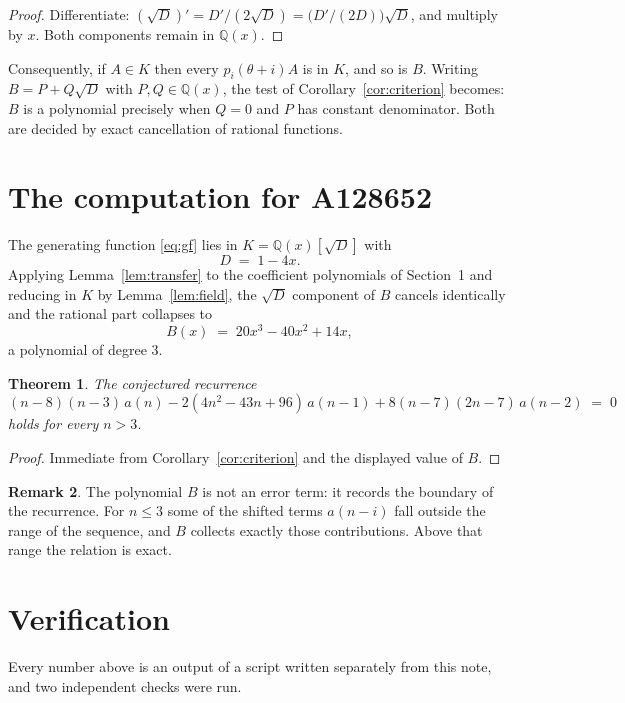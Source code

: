 \documentclass[11pt,a4paper]{article}
\theoremstyle{plain}
\newtheorem{theorem}{Theorem}
\theoremstyle{definition}
\newtheorem{remark}[theorem]{Remark}
\begin{document}
\begin{proof}
Differentiate: $(\sqrt{D})'=D'/(2\sqrt{D})=\bigl(D'/(2D)\bigr)\sqrt{D}$, and multiply by
$x$. Both components remain in $\mathbb{Q}(x)$.
\end{proof}

Consequently, if $A\in K$ then every $p_{i}(\theta+i)A$ is in $K$, and so is $B$. Writing
$B=P+Q\sqrt{D}$ with $P,Q\in\mathbb{Q}(x)$, the test of Corollary~\ref{cor:criterion}
becomes: $B$ is a polynomial precisely when $Q=0$ and $P$ has constant denominator. Both
are decided by exact cancellation of rational functions.

\section{The computation for A128652}

The generating function \eqref{eq:gf} lies in $K=\mathbb{Q}(x)[\sqrt{D}]$ with
\[
D \;=\; 1 - 4 x .
\]
Applying Lemma~\ref{lem:transfer} to the coefficient polynomials of Section~1 and reducing
in $K$ by Lemma~\ref{lem:field}, the $\sqrt{D}$ component of $B$ cancels identically and
the rational part collapses to
\[
B(x)\;=\;20 x^{3} - 40 x^{2} + 14 x ,
\]
a polynomial of degree $3$.

\begin{theorem}
The conjectured recurrence
\[
\left(n - 8\right) \left(n - 3\right)\,a(n) -  2 \left(4 n^{2} - 43 n + 96\right)\,a(n-1) + 8 \left(n - 7\right) \left(2 n - 7\right)\,a(n-2) \;=\;0
\]
holds for every $n>3$.
\end{theorem}

\begin{proof}
Immediate from Corollary~\ref{cor:criterion} and the displayed value of $B$.
\end{proof}

\begin{remark}
The polynomial $B$ is not an error term: it records the boundary of the recurrence. For
$n\le3$ some of the shifted terms $a(n-i)$ fall outside the range of the sequence,
and $B$ collects exactly those contributions. Above that range the relation is exact.
\end{remark}

\section{Verification}

Every number above is an output of a script written separately from this note, and two
independent checks were run.
\end{document}
